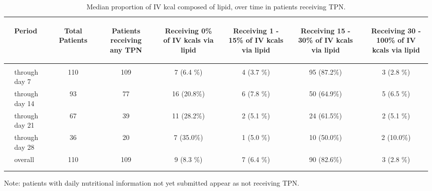 \documentclass[dvips,10pt]{article}
\begin{document}
\begin{table}[t]
\caption
{ Median proportion of IV kcal composed of lipid, over time in patients receiving TPN. }
\begin{center}
\begin{tabular}{ @{}l@{}
@{}l@{}@{}p{1.5em}@{}@{}c@{}@{}p{1.5em}@{}@{}c@{}@{}p{1.5em}@{}@{}c@{}@{}p{1.5em}@{}@{}c@{}@{}p{1.5em}@{}@{}c@{}@{}p{1.5em}@{}@{}c@{}
}
\hline

& \parbox{6em}{\begin{center}Period\end{center}} && \parbox{6em}{\begin{center}Total Patients\end{center}} && \parbox{6em}{\begin{center}Patients receiving any TPN\end{center}} && \parbox{6em}{\begin{center}Receiving 0\% of IV kcals via lipid\end{center}} && \parbox{6em}{\begin{center}Receiving 1 - 15\% of IV kcals via lipid\end{center}} && \parbox{6em}{\begin{center}Receiving 15 - 30\% of IV kcals via lipid\end{center}} && \parbox{6em}{\begin{center}Receiving 30 - 100\% of IV kcals via lipid\end{center}} \\

\hline

\\
& through day 7 && 110 && 109 && 7 (6.4 \%) && 4 (3.7 \%) && 95 (87.2\%) && 3 (2.8 \%) \\
& through day 14 && 93 && 77 && 16 (20.8\%) && 6 (7.8 \%) && 50 (64.9\%) && 5 (6.5 \%) \\
& through day 21 && 67 && 39 && 11 (28.2\%) && 2 (5.1 \%) && 24 (61.5\%) && 2 (5.1 \%) \\
& through day 28 && 36 && 20 && 7 (35.0\%) && 1 (5.0 \%) && 10 (50.0\%) && 2 (10.0\%) \\
& overall && 110 && 109 && 9 (8.3 \%) && 7 (6.4 \%) && 90 (82.6\%) && 3 (2.8 \%) \\
\\
\hline \\

\end{tabular}


\parbox{ 5in }{  Note: patients with daily nutritional information not yet submitted appear as not receiving TPN. } \\
 \vspace{1em}\end{center}
 \end{table}
\end{document}
